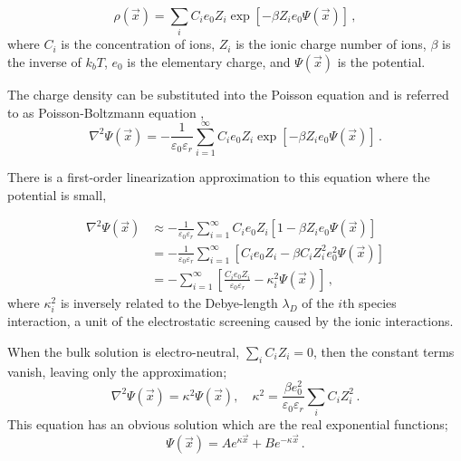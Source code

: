 \begin{equation}
	\rho(\vec{x}) = \sum_i C_i e_0 Z_i \exp{\left[-\beta Z_i e_0\Psi(\vec{x})\right]}\,,
\end{equation}
where $C_i$ is the concentration of ions, $Z_i$ is the ionic charge number of ions, $\beta$ is the inverse of $k_bT$, $e_0$ is the elementary charge, and $\Psi(\vec{x})$ is the potential.

The charge density can be substituted into the Poisson equation and is referred to as Poisson-Boltzmann equation \cite{daune1999molecular, jackson2006molecular},
\begin{equation}
	\nabla^2 \Psi(\vec{x}) = -\frac{1}{\varepsilon_0 \varepsilon_r}\sum_{i =1}^\infty C_i e_0 Z_i \exp{\left[-\beta Z_i e_0\Psi(\vec{x})\right]}\,.
\end{equation}

There is a first-order linearization approximation to this equation where the potential is small,

\begin{align*}
	\nabla^2 \Psi(\vec{x}) &\approx -\frac{1}{\varepsilon_0 \varepsilon_r}\sum_{i =1}^\infty C_i e_0 Z_i \left[1-\beta Z_i e_0\Psi(\vec{x})\right]\\
	&= -\frac{1}{\varepsilon_0 \varepsilon_r}\sum_{i =1}^\infty \left[C_i e_0 Z_i-\beta C_i Z_i^2 e_0^2\Psi(\vec{x})\right]\\
	&= -\sum_{i =1}^\infty \left[\frac{C_i e_0 Z_i}{\varepsilon_0 \varepsilon_r}-\kappa_i^2 \Psi(\vec{x})\right]\,,
\end{align*}
where $\kappa_i^2$ is inversely related to the Debye-length $\lambda_D$ of the $i$th species interaction, a unit of the electrostatic screening caused by the ionic interactions. 

When the bulk solution is electro-neutral, $\sum_i C_i Z_i = 0$, then the constant terms vanish, leaving only the approximation;
\begin{equation}
	\nabla^2 \Psi(\vec{x}) = \kappa^2 \Psi(\vec{x}), \quad \kappa^2 = \frac{\beta e_0^2}{\varepsilon_0 \varepsilon_r} \sum_i C_i Z_i^2\,.
\end{equation}
This equation has an obvious solution which are the real exponential functions;
\begin{equation}\label{eqn:debye_huckel}
	\Psi(\vec{x}) = A e^{\kappa\vec{x}} + B e^{-\kappa\vec{x}}\,.
\end{equation}

